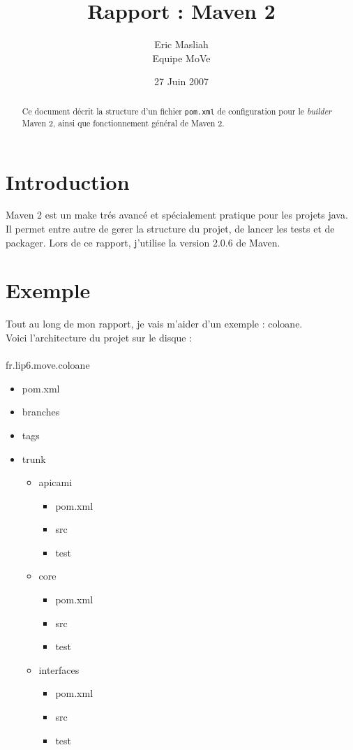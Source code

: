 \documentclass[a4paper,10pt]{article}
\title{Rapport : Maven 2}
\author{Eric Masliah\\
Equipe MoVe}
\date{27 Juin 2007}
\begin{document}
\maketitle

\begin{abstract}
Ce document décrit la structure d'un fichier \texttt{pom.xml} de configuration pour le \textit{builder} Maven 2, ainsi que fonctionnement général de Maven 2.
\end{abstract}

\section{Introduction}
Maven 2 est un make trés avancé et spécialement pratique pour les projets java.
Il permet entre autre de gerer la structure du projet, de lancer les tests et de packager.
Lors de ce rapport, j'utilise la version 2.0.6 de Maven.

\section{Exemple}
Tout au long de mon rapport, je vais m'aider d'un exemple : coloane.\\
Voici l'architecture du projet sur le disque :\\
\\
fr.lip6.move.coloane
\begin{itemize}
  \item pom.xml
  \item branches
  \item tags
  \item trunk
  \begin{itemize}
    \item apicami
      \begin{itemize}
        \item pom.xml
        \item src
        \item test
      \end{itemize}
    \item core
      \begin{itemize}
        \item pom.xml
        \item src
        \item test
      \end{itemize}
    \item interfaces
      \begin{itemize}
        \item pom.xml
        \item src
        \item test
      \end{itemize}
  \end{itemize}
\end{itemize}
\end{document}
